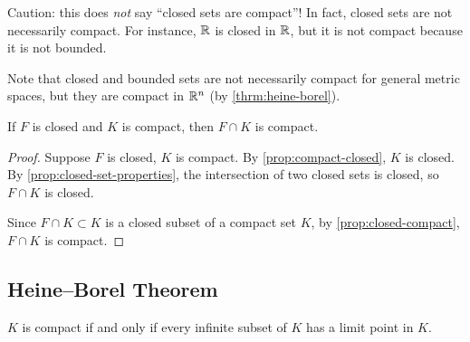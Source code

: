 \begin{remark}
Caution: this does \emph{not} say ``closed sets are compact''! In fact, closed sets are not necessarily compact. For instance, $\mathbb R$ is closed in $\mathbb R$, but it is not compact because it is not bounded.

Note that closed and bounded sets are not necessarily compact for general metric spaces, but they are compact in $\mathbb R^n$ (by \cref{thrm:heine-borel}).
\end{remark}

\begin{corollary}
If $F$ is closed and $K$ is compact, then $F\cap K$ is compact.
\end{corollary}

\begin{proof}
Suppose $F$ is closed, $K$ is compact. By \cref{prop:compact-closed}, $K$ is closed. By \cref{prop:closed-set-properties}, the intersection of two closed sets is closed, so $F\cap K$ is closed.

Since $F\cap K\subset K$ is a closed subset of a compact set $K$, by \cref{prop:closed-compact}, $F\cap K$ is compact.
\end{proof}

\subsection{Heine--Borel Theorem}
\begin{proposition}\label{prop:infinite-compact-lp}
$K$ is compact if and only if every infinite subset of $K$ has a limit point in $K$.
\end{proposition}

